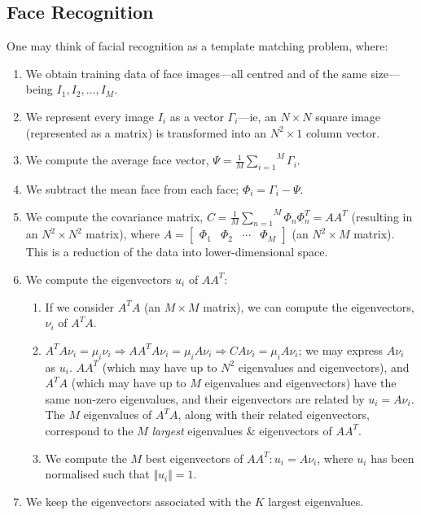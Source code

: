
\subsection{Face Recognition}\label{sub_sec:face_recognition}

One may think of facial recognition as a template matching problem, where:

\begin{enumerate}
    \item We obtain training data of face images---all centred and of the same size---being $I_{1}, I_{2}, \ldots, I_{M}$.
    \item We represent every image $I_{i}$ as a vector $\Gamma_{i}$---ie, an $N \times N$ square image (represented as a matrix) is transformed into an $N^{2} \times 1$ column vector.
    \item We compute the average face vector, $\Psi = \frac{1}{M} \overset{M}{\underset{i=1}{\sum}} \Gamma_{i}$.
    \item We subtract the mean face from each face; $\Phi_{i} = \Gamma_{i} - \Psi$.
    \item We compute the covariance matrix, $C = \frac{1}{M} \overset{M}{\underset{n=1}{\sum}} \Phi_{n} \Phi_{n}^{T} = A A^{T}$ (resulting in an $N^{2} \times N^{2}$ matrix), where $A = \begin{bmatrix} \Phi_{1} & \Phi_{2} & \cdots & \Phi_{M} \end{bmatrix}$ (an $N^{2} \times M$ matrix). This is a reduction of the data into lower-dimensional space.
    \item We compute the eigenvectors $u_{i}$ of $A A^{T}$:
    \begin{enumerate}
        \item If we consider $A^{T} A$ (an $M \times M$ matrix), we can compute the eigenvectors, $\nu_{i}$ of $A^{T} A$.
        \item $A^{T} A \nu_{i} = \mu_{i} \nu_{i} \Rightarrow A A^{T} A \nu_{i} = \mu_{i} A \nu_{i} \Rightarrow C A \nu_{i} = \mu_{i} A \nu_{i}$; we may express $A \nu_{i}$ as $u_{i}$. $A A^{T}$ (which may have up to $N^{2}$ eigenvalues and eigenvectors), and $A^{T} A$ (which may have up to $M$ eigenvalues and eigenvectors) have the same non-zero eigenvalues, and their eigenvectors are related by $u_{i} = A \nu_{i}$. The $M$ eigenvalues of $A^{T} A$, along with their related eigenvectors, correspond to the $M$ \emph{largest} eigenvalues \& eigenvectors of $A A^{T}$.
        \item We compute the $M$ best eigenvectors of $A A^{T}: u_{i} = A \nu_{i}$, where $u_{i}$ has been normalised such that $\Vert u_{i} \Vert = 1$.
    \end{enumerate}
    \item We keep the eigenvectors associated with the $K$ largest eigenvalues.
\end{enumerate}

